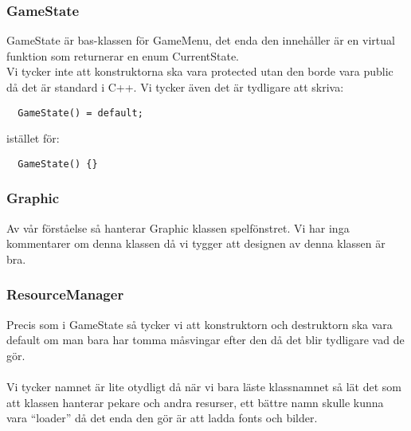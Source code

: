 \documentclass{TDP003mall}
\begin{document}
\subsubsection{GameState}
GameState är bas-klassen för GameMenu, det enda den innehåller är en virtual funktion som returnerar en enum CurrentState. \\
Vi tycker inte att konstruktorna ska vara protected utan den borde vara public då det är standard i C++. Vi tycker även det är tydligare att skriva: \begin{frame}[]
\begin{lstlisting}
  GameState() = default;
\end{lstlisting}
\end{frame}
istället för: \begin{frame}[]
\begin{lstlisting}
  GameState() {}
\end{lstlisting}
\end{frame}

\subsubsection{Graphic}
Av vår förståelse så hanterar Graphic klassen spelfönstret. Vi har inga kommentarer om denna klassen då vi tygger att designen av denna klassen är bra.

\subsubsection{ResourceManager}
Precis som i GameState så tycker vi att konstruktorn och destruktorn ska vara default om man bara har tomma måsvingar efter den då det blir tydligare vad de gör. \\\\
Vi tycker namnet är lite otydligt då när vi bara läste klassnamnet så lät det som att klassen hanterar pekare och andra resurser, ett bättre namn skulle kunna vara ``loader'' då det enda den gör är att ladda fonts och bilder.
\end{document}
